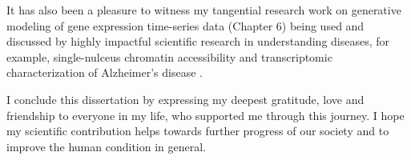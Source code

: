 It has also been a pleasure to witness my tangential research work on generative modeling of gene expression time-series data (Chapter 6) being used and discussed by highly impactful scientific research in understanding diseases, for example, single-nulceus chromatin accessibility and transcriptomic characterization of Alzheimer's disease \citep{morabito2021single}.

I conclude this dissertation by expressing my deepest gratitude, love and friendship to everyone in my life, who supported me through this journey. I hope my scientific contribution helps towards further progress of our society and to improve the human condition in general.
